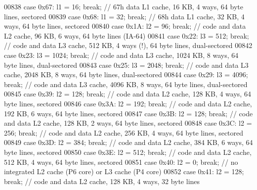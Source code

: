 \begin{DoxyCode}
{00838       \textcolor{keywordflow}{case} 0x67: l1 = 16; \textcolor{keywordflow}{break};  \textcolor{comment}{// 67h   data L1 cache, 16 KB, 4 ways, 64 byte lines, sectored}
00839       \textcolor{keywordflow}{case} 0x68: l1 = 32; \textcolor{keywordflow}{break};  \textcolor{comment}{// 68h   data L1 cache, 32 KB, 4 ways, 64 byte lines, sectored}
00840       \textcolor{keywordflow}{case} 0x1A: l2 = 96; \textcolor{keywordflow}{break};   \textcolor{comment}{// code and data L2 cache, 96 KB, 6 ways, 64 byte lines (IA-64)}
00841       \textcolor{keywordflow}{case} 0x22: l3 = 512; \textcolor{keywordflow}{break};   \textcolor{comment}{// code and data L3 cache, 512 KB, 4 ways (!), 64 byte lines,
       dual-sectored}
00842       \textcolor{keywordflow}{case} 0x23: l3 = 1024; \textcolor{keywordflow}{break};   \textcolor{comment}{// code and data L3 cache, 1024 KB, 8 ways, 64 byte lines,
       dual-sectored}
00843       \textcolor{keywordflow}{case} 0x25: l3 = 2048; \textcolor{keywordflow}{break};   \textcolor{comment}{// code and data L3 cache, 2048 KB, 8 ways, 64 byte lines,
       dual-sectored}
00844       \textcolor{keywordflow}{case} 0x29: l3 = 4096; \textcolor{keywordflow}{break};   \textcolor{comment}{// code and data L3 cache, 4096 KB, 8 ways, 64 byte lines,
       dual-sectored}
00845       \textcolor{keywordflow}{case} 0x39: l2 = 128; \textcolor{keywordflow}{break};   \textcolor{comment}{// code and data L2 cache, 128 KB, 4 ways, 64 byte lines, sectored}
00846       \textcolor{keywordflow}{case} 0x3A: l2 = 192; \textcolor{keywordflow}{break};   \textcolor{comment}{// code and data L2 cache, 192 KB, 6 ways, 64 byte lines, sectored}
00847       \textcolor{keywordflow}{case} 0x3B: l2 = 128; \textcolor{keywordflow}{break};   \textcolor{comment}{// code and data L2 cache, 128 KB, 2 ways, 64 byte lines, sectored}
00848       \textcolor{keywordflow}{case} 0x3C: l2 = 256; \textcolor{keywordflow}{break};   \textcolor{comment}{// code and data L2 cache, 256 KB, 4 ways, 64 byte lines, sectored}
00849       \textcolor{keywordflow}{case} 0x3D: l2 = 384; \textcolor{keywordflow}{break};   \textcolor{comment}{// code and data L2 cache, 384 KB, 6 ways, 64 byte lines, sectored}
00850       \textcolor{keywordflow}{case} 0x3E: l2 = 512; \textcolor{keywordflow}{break};   \textcolor{comment}{// code and data L2 cache, 512 KB, 4 ways, 64 byte lines, sectored}
00851       \textcolor{keywordflow}{case} 0x40: l2 = 0; \textcolor{keywordflow}{break};   \textcolor{comment}{// no integrated L2 cache (P6 core) or L3 cache (P4 core)}
00852       \textcolor{keywordflow}{case} 0x41: l2 = 128; \textcolor{keywordflow}{break};   \textcolor{comment}{// code and data L2 cache, 128 KB, 4 ways, 32 byte lines}
}
\end{DoxyCode}
